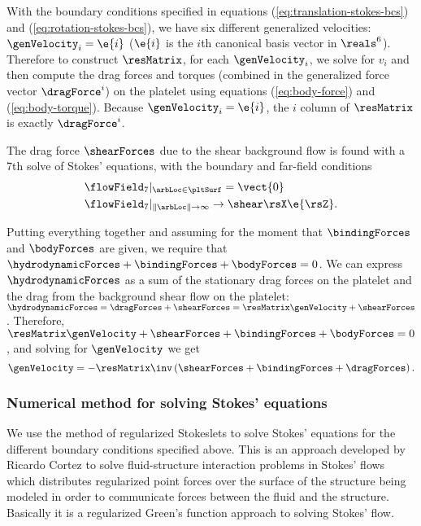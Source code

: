 With the boundary conditions specified in equations
(\ref{eq:translation-stokes-bcs}) and (\ref{eq:rotation-stokes-bcs}),
we have six different generalized velocities: $\genVelocity_i = \e{i}$
($\e{i}$ is the $i$th canonical basis vector in $\reals^6$). Therefore
to construct $\resMatrix$, for each $\genVelocity_i$, we solve for
$v_i$ and then compute the drag forces and torques (combined in the
generalized force vector $\dragForce^i$) on the platelet using
equations (\ref{eq:body-force}) and (\ref{eq:body-torque}). Because
$\genVelocity_i = \e{i}$, the $i$ column of $\resMatrix$ is exactly
$\dragForce^i$.

The drag force $\shearForces$ due to the shear background flow is
found with a 7th solve of Stokes' equations, with the boundary and
far-field conditions
\begin{align}
  &\flowField_7 |_{\arbLoc \in \pltSurf} =
  \vect{0} \label{eq:plt-bcs-shear} \\
  &\flowField_7 |_{\|\arbLoc\| \rightarrow \infty} \rightarrow
  \shear \rsX \e{\rsZ}. \label{eq:plt-far-field-shear}
\end{align}

Putting everything together and assuming for the moment that
$\bindingForces$ and $\bodyForces$ are given, we require that
$\hydrodynamicForces + \bindingForces + \bodyForces = 0$. We can
express $\hydrodynamicForces$ as a sum of the stationary drag forces
on the platelet and the drag from the background shear flow on the
platelet: $\hydrodynamicForces = \dragForces + \shearForces =
\resMatrix \genVelocity + \shearForces$. Therefore, $\resMatrix
\genVelocity + \shearForces + \bindingForces + \bodyForces = 0$, and
solving for $\genVelocity$ we get
\begin{equation}
  \label{eq:gen-velocity-equation}
  \genVelocity = -\resMatrix\inv \left(\shearForces + \bindingForces +
    \dragForces \right).
\end{equation}

\subsubsection{Numerical method for solving Stokes' equations}
\label{sec:numer-meth-solv}

We use the method of regularized Stokeslets to solve Stokes' equations
for the different boundary conditions specified above. This is an
approach developed by Ricardo Cortez to solve fluid-structure
interaction problems in Stokes' flows which distributes regularized
point forces over the surface of the structure being modeled in order
to communicate forces between the fluid and the structure. Basically
it is a regularized Green's function approach to solving Stokes' flow.

